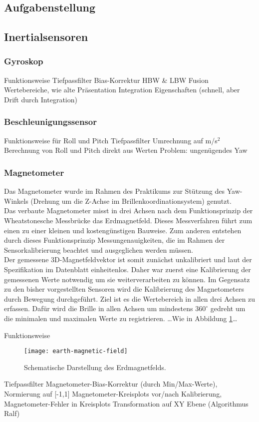 
\subsection{Aufgabenstellung}


\subsection{Inertialsensoren}

\subsubsection{Gyroskop}
Funktionsweise
Tiefpassfilter
Bias-Korrektur
HBW \& LBW Fusion
Wertebereiche, wie alte Präsentation
Integration
Eigenschaften (schnell, aber Drift durch Integration)


\subsubsection{Beschleunigungssensor}
Funktionsweise
für Roll und Pitch
Tiefpassfilter
Umrechnung auf m/s$^2$
Berechnung von Roll und Pitch direkt aus Werten
Problem: ungenügendes Yaw


\subsubsection{Magnetometer}
Das Magnetometer wurde im Rahmen des Praktikums zur Stützung des Yaw-Winkels (Drehung um die Z-Achse im Brillenkoordinationsystem) genutzt.\\
Das verbaute Magnetometer misst in drei Achsen nach dem Funktionsprinzip der Wheatstonesche Messbrücke \cite{renaudin2010complete} das Erdmagnetfeld. Dieses Messverfahren führt zum einen zu einer kleinen und kostengünstigen Bauweise. Zum anderen entstehen durch dieses Funktionsprinzip Messungenauigkeiten, die im Rahmen der Sensorkalibrierung beachtet und ausgeglichen werden müssen.\\
Der gemessene 3D-Magnetfeldvektor ist somit zunächst unkalibriert und laut der Spezifikation im Datenblatt  einheitenlos.
Daher war zuerst eine Kalibrierung der gemessenen Werte notwendig um sie weiterverarbeiten zu können. Im Gegensatz zu den bisher vorgestellten Sensoren wird die Kalibrierung des Magnetometers durch Bewegung durchgeführt. Ziel ist es die Wertebereich in allen drei Achsen zu erfassen. Dafür wird die Brille in allen Achsen um mindestens $360^\circ$ gedreht um die minimalen und maximalen Werte zu registrieren. \ldots Wie in Abbildung \ref{fig:mag_world}\ldots



Funktionsweise

\begin{figure}
   \centering
   \texttt{[image: earth-magnetic-field]}
   \caption[mag_world]{Schematische Darstellung des Erdmagnetfelds.}
   \label{fig:mag_world}
\end{figure}


Tiefpassfilter
Magnetometer-Bias-Korrektur (durch Min/Max-Werte), Normierung auf [-1,1]
Magnetometer-Kreisplots vor/nach Kalibrierung, Magnetometer-Fehler in Kreisplots
Transformation auf XY Ebene (Algorithmus Ralf)


